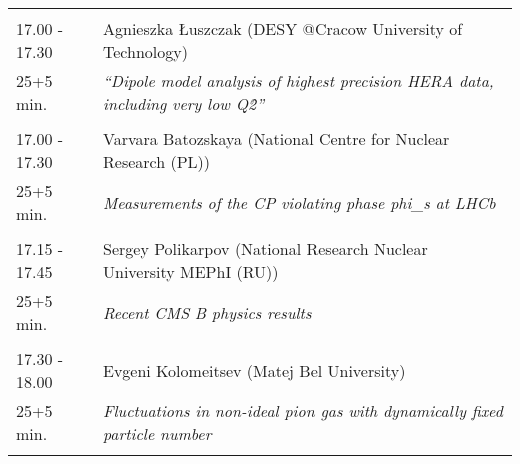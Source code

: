 \begin{longtable}{p{3cm}p{13cm}}
 & \\ 
17.00 - 17.30 & Agnieszka Łuszczak (DESY @Cracow University of Technology)\\ 
25+5 min. & {\it “Dipole model analysis of highest precision HERA data, including very low Q\^2”}\\ 
 & \\ 
17.00 - 17.30 & Varvara Batozskaya (National Centre for Nuclear Research (PL))\\ 
25+5 min. & {\it Measurements of the CP violating phase phi\_s at LHCb}\\ 
 & \\ 
17.15 - 17.45 & Sergey Polikarpov (National Research Nuclear  University MEPhI (RU))\\ 
25+5 min. & {\it Recent CMS B physics results}\\ 
 & \\ 
17.30 - 18.00 & Evgeni Kolomeitsev (Matej Bel University)\\ 
25+5 min. & {\it Fluctuations in non-ideal pion gas with dynamically fixed particle number}\\ 
 & \\ 
\end{longtable}

